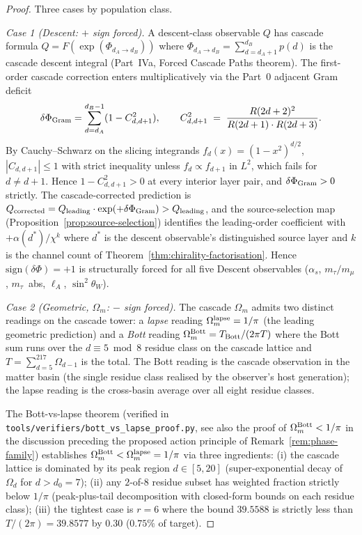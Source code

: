 \documentclass[12pt,a4paper]{article}
\begin{document}
\begin{proof}
Three cases by population class.

\emph{Case 1 (Descent: $+$ sign forced).} A descent-class observable
$Q$ has cascade formula $Q = F(\exp(\Phi_{d_A\to d_B}))$ where
$\Phi_{d_A\to d_B}=\sum_{d=d_A+1}^{d_B}p(d)$ is the cascade descent
integral (Part~IVa, Forced Cascade Paths theorem). The first-order
cascade correction enters multiplicatively via the Part~0 adjacent
Gram deficit
\[
\delta\Phi_{\rm Gram} = \sum_{d=d_A}^{d_B-1}(1 - C^2_{d,d+1}),
\qquad
C^2_{d,d+1}\;=\;\frac{R(2d+2)^2}{R(2d+1)\cdot R(2d+3)}.
\]
By Cauchy--Schwarz on the slicing integrands $f_d(x)=(1-x^2)^{d/2}$,
$|C_{d,d+1}|\leq 1$ with strict inequality unless $f_d \propto f_{d+1}$
in $L^2$, which fails for $d\neq d+1$. Hence
$1 - C^2_{d,d+1}>0$ at every interior layer pair, and
$\delta\Phi_{\rm Gram}>0$ strictly. The cascade-corrected prediction is
$Q_{\rm corrected} = Q_{\rm leading}\cdot \exp(+\delta\Phi_{\rm Gram})>Q_{\rm leading}$,
and the source-selection map (Proposition~\ref{prop:source-selection})
identifies the leading-order coefficient with $+\alpha(d^*)/\chi^k$
where $d^*$ is the descent observable's distinguished source layer
and $k$ is the channel count of Theorem~\ref{thm:chirality-factorisation}.
Hence $\mathrm{sign}(\delta\Phi)=+1$ is structurally forced for all
five Descent observables ($\alpha_s$, $m_\tau/m_\mu$, $m_\tau$~abs,
$\ell_A$, $\sin^2\theta_W$).

\emph{Case 2 (Geometric, $\Omega_m$: $-$ sign forced).} The cascade
$\Omega_m$ admits two distinct readings on the cascade tower: a
\emph{lapse} reading $\Omega_m^{\rm lapse}=1/\pi$ (the leading geometric
prediction) and a \emph{Bott} reading
$\Omega_m^{\rm Bott} = T_{\rm Bott}/(2\pi T)$ where the Bott sum runs
over the $d\equiv 5\bmod 8$ residue class on the cascade lattice and
$T = \sum_{d=5}^{217}\Omega_{d-1}$ is the total. The Bott reading is
the cascade observation in the matter basin (the single residue class
realised by the observer's host generation); the lapse reading is the
cross-basin average over all eight residue classes.

The Bott-vs-lapse theorem (verified in
\texttt{tools/verifiers/bott\_vs\_lapse\_proof.py}, see also
the proof of $\Omega_m^{\rm Bott} < 1/\pi$ in
the discussion preceding the proposed action principle of
Remark~\ref{rem:phase-family}) establishes
$\Omega_m^{\rm Bott} < \Omega_m^{\rm lapse} = 1/\pi$ via three
ingredients:
(i) the cascade lattice is dominated by its peak region $d\in[5,20]$
(super-exponential decay of $\Omega_d$ for $d>d_0=7$);
(ii) any $2$-of-$8$ residue subset has weighted fraction strictly
below $1/\pi$ (peak-plus-tail decomposition with closed-form bounds
on each residue class);
(iii) the tightest case is $r=6$ where the bound $39.5588$ is strictly
less than $T/(2\pi)=39.8577$ by $0.30$ ($0.75\%$ of target).


\end{proof}
\end{document}
